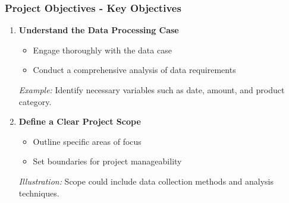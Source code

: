 \documentclass[aspectratio=169]{beamer}
\begin{document}
\begin{frame}[fragile]
    \frametitle{Project Objectives - Key Objectives}
    \begin{enumerate}
        \item \textbf{Understand the Data Processing Case}
        \begin{itemize}
            \item Engage thoroughly with the data case
            \item Conduct a comprehensive analysis of data requirements
        \end{itemize}
        \textit{Example:} Identify necessary variables such as date, amount, and product category.
        
        \item \textbf{Define a Clear Project Scope}
        \begin{itemize}
            \item Outline specific areas of focus 
            \item Set boundaries for project manageability
        \end{itemize}
        \textit{Illustration:} Scope could include data collection methods and analysis techniques.
    \end{enumerate}
\end{frame}
\end{document}
